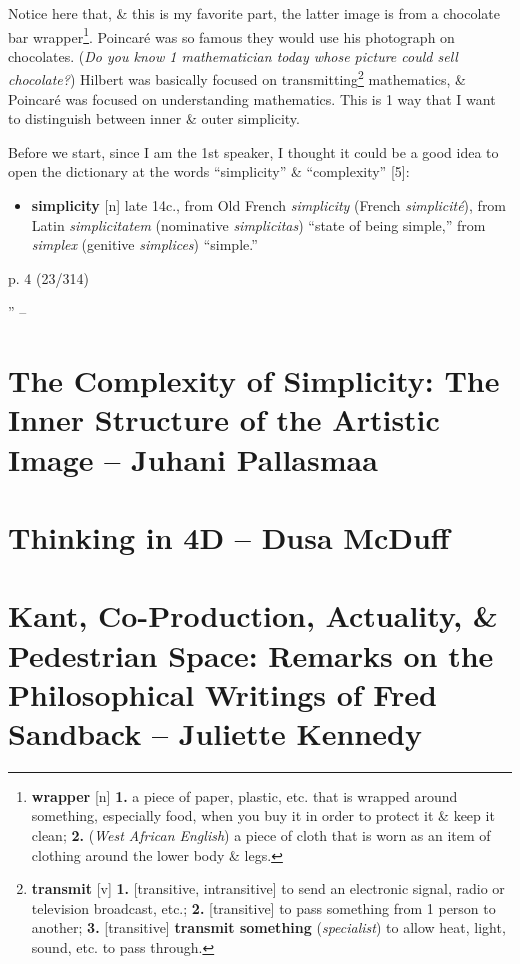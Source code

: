 \documentclass[oneside]{book}
\numberwithin{equation}{section}
\begin{document}
Notice here that, \& this is my favorite part, the latter image is from a chocolate bar wrapper\footnote{\textbf{wrapper} [n] \textbf{1.} a piece of paper, plastic, etc. that is wrapped around something, especially food, when you buy it in order to protect it \& keep it clean; \textbf{2.} (\textit{West African English}) a piece of cloth that is worn as an item of clothing around the lower body \& legs.}. Poincar\'e was so famous they would use his photograph on chocolates. (\textit{Do you know 1 mathematician today whose picture could sell chocolate?}) Hilbert was basically focused on transmitting\footnote{\textbf{transmit} [v] \textbf{1.} [transitive, intransitive] to send an electronic signal, radio or television broadcast, etc.; \textbf{2.} [transitive] to pass something from 1 person to another; \textbf{3.} [transitive] \textbf{transmit something} (\textit{specialist}) to allow heat, light, sound, etc. to pass through.} mathematics, \& Poincar\'e was focused on understanding mathematics. This is 1 way that I want to distinguish between inner \& outer simplicity.

Before we start, since I am the 1st speaker, I thought it could be a good idea to open the dictionary at the words ``simplicity'' \& ``complexity'' [5]:
\begin{itemize}
	\item \textbf{simplicity} [n] late 14c., from Old French \textit{simplicity} (French \textit{simplicit\'e}), from Latin \textit{simplicitatem} (nominative \textit{simplicitas}) ``state of being simple,'' from \textit{simplex} (genitive \textit{simplices}) ``simple.''
\end{itemize}
p. 4 (23/314)

'' -- \cite[pp. 3--]{Kossak_Ording2017}

\section{The Complexity of Simplicity: The Inner Structure of the Artistic Image -- Juhani Pallasmaa}

\section{Thinking in 4D -- Dusa McDuff}

\section{Kant, Co-Production, Actuality, \& Pedestrian Space: Remarks on the Philosophical Writings of Fred Sandback -- Juliette Kennedy}
\end{document}
